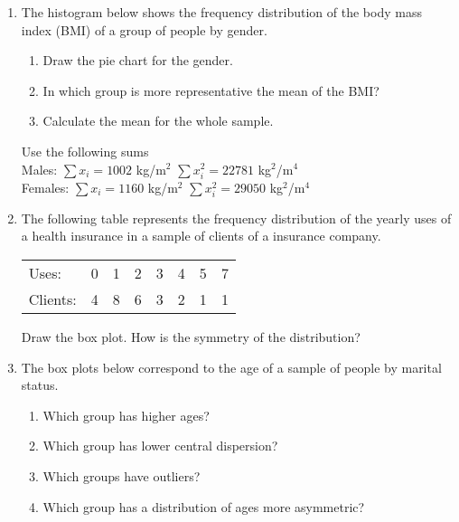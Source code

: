 \begin{enumerate}[leftmargin=*]
\item The histogram below shows the frequency distribution of the body mass index (BMI) of a group of people by gender.
\begin{center}
\resizebox{0.6\textwidth}{!}{}
\end{center}

\begin{enumerate}
\item Draw the pie chart for the gender.
\item In which group is more representative the mean of the BMI?
\item Calculate the mean for the whole sample.
\end{enumerate}
Use the following sums\\
Males: $\sum x_i=1002$ kg/m$^2$ \quad $\sum x_i^2 = 22781$ kg$^2$/m$^4$ \\
Females: $\sum x_i=1160$ kg/m$^2$ \quad $\sum x_i^2 = 29050$ kg$^2$/m$^4$

\item The following table represents the frequency distribution of the yearly uses of a health insurance in a sample of
clients of a insurance company.

\begin{center}
\begin{tabular}{lrrrrrrr}
\toprule
Uses: & 0 & 1 & 2 & 3 & 4 & 5 & 7 \\
Clients: & 4 & 8 & 6 & 3 & 2 & 1 & 1\\
\bottomrule
\end{tabular}
\end{center}

Draw the box plot. How is the symmetry of the distribution?


\item The box plots below correspond to the age of a sample of people by marital status.
\begin{center}
\resizebox{0.6\textwidth}{!}{}
\end{center}

\begin{enumerate}
\item Which group has higher ages?
\item Which group has lower central dispersion?
\item Which groups have outliers?
\item Which group has a distribution of ages more asymmetric?
\end{enumerate}



\end{enumerate}
